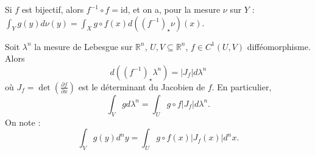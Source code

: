 \begin{remark}
    Si $f$ est bijectif, alors $f^{-1}\circ f = \mathrm{id}$, et on a, pour la mesure $\nu$ sur $Y$ : $\int_Y g(y) d\nu(y) = \int_X g\circ f(x) d((f^{-1})_\star\nu)(x)$.
\end{remark}

\begin{theo}
    Soit $\lambda^n$ la mesure de Lebesgue sur $\mathbb{R}^n$, $U,V\subseteq\mathbb{R}^n$, $f\in C^1(U,V)$ difféomorphisme. Alors 
    \begin{equation}
        d((f^{-1})_\star\lambda^n) = |J_f|d\lambda^n
    \end{equation}
    où $J_f = \det(\frac{\partial f}{\partial x})$ est le déterminant du Jacobien de $f$. En particulier,
    \begin{equation}
        \int_V g d\lambda^n = \int_U g\circ f |J_f| d\lambda^n.
    \end{equation}
    On note :
    \begin{equation}
        \int_V g(y) d^n y = \int_U g\circ f(x) |J_f(x)| d^n x.
    \end{equation}
\end{theo}


